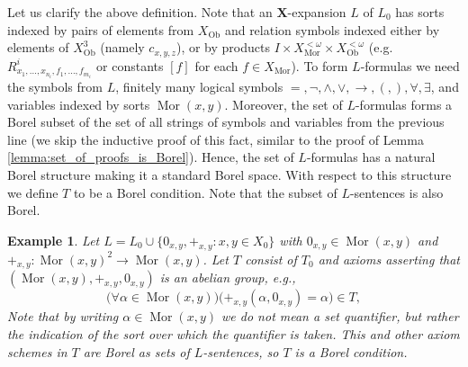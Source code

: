 \documentclass[12pt]{amsart}
\newtheorem{example}[theorem]{Example}
\DeclareMathOperator{\Mor}{Mor}
\DeclareMathOperator{\Ob}{Ob}
\begin{document}
Let us clarify the above definition. Note that an $\mathbf{X}$-expansion $L$ of $L_0$ has sorts indexed by pairs of elements from $X_{\Ob}$ and relation symbols indexed either by elements of $X_{\Ob}^3$ (namely $c_{x,y,z}$), or by products $I \times X_{\Mor}^{<\omega} \times X_{\Ob}^{<\omega}$ (e.g. $R_{x_1, \dots, x_{n_i}, f_1, \dots, f_{m_i}}^i$ or constants $[f]$ for each ${f \in X_{\Mor}}$). To form $L$-formulas we need the symbols from $L$, finitely many logical symbols $=,\neg, \wedge, \vee, \rightarrow, (, ), \forall, \exists$, and variables indexed by sorts $\Mor(x,y)$. Moreover, the set of $L$-formulas forms a Borel subset of the set of all strings of symbols and variables from the previous line (we skip the inductive proof of this fact, similar to the proof of Lemma \ref{lemma:set_of_proofs_is_Borel}). Hence, the set of $L$-formulas has a natural Borel structure making it a standard Borel space. With respect to this structure we define $T$ to be a Borel condition. Note that the subset of $L$-sentences is also Borel.

\begin{example}\label{example:Borel_condition}
    Let $L = L_0 \cup \{0_{x,y}, +_{x,y}:x,y \in X_0\}$ with $0_{x,y} \in \Mor(x,y)$ and $+_{x,y}:\Mor(x,y)^2 \to \Mor(x,y)$. Let $T$ consist of $T_0$ and axioms asserting that $(\Mor(x,y), +_{x,y}, 0_{x,y})$ is an abelian group, e.g.,
    \[ \bigl( \forall \alpha \in \Mor(x,y) \bigr)\bigl( +_{x,y}(\alpha, 0_{x,y}) = \alpha \bigr) \in T, \]
    Note that by writing $\alpha \in \Mor(x,y)$ we do not mean a set quantifier, but rather the indication of the sort over which the quantifier is taken. This and other axiom schemes in $T$ are Borel as sets of $L$-sentences, so $T$ is a Borel condition.
\end{example}
\end{document}
